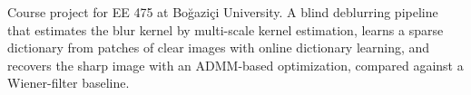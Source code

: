 \ProjectSkipTitlePage
{}

\begin{ProjectSummary}
Course project for EE 475 at Boğaziçi University. A blind deblurring pipeline that estimates the
blur kernel by multi-scale kernel estimation, learns a sparse dictionary from patches of clear
images with online dictionary learning, and recovers the sharp image with an ADMM-based
optimization, compared against a Wiener-filter baseline.
\end{ProjectSummary}


